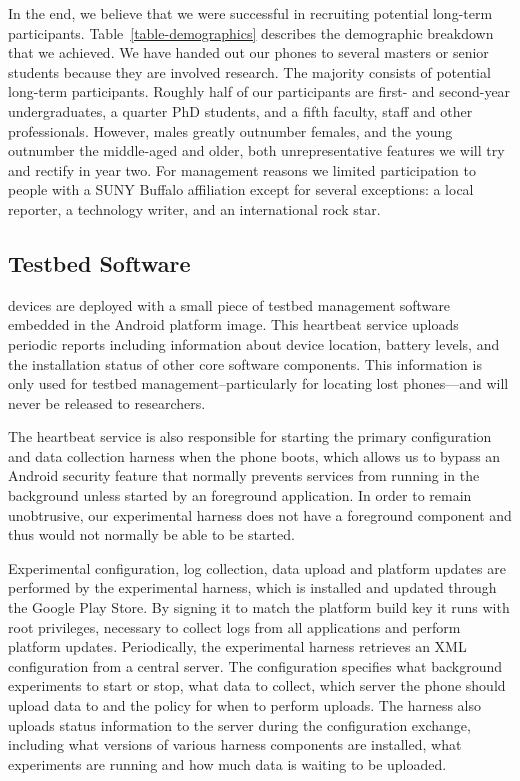 In the end, we believe that we were successful in recruiting potential
long-term participants. Table~\ref{table-demographics} describes the
demographic breakdown that we achieved. We have handed out our phones to
several masters or senior students because they are involved \PhoneLab{}
research. The majority consists of potential long-term participants. Roughly
half of our participants are first- and second-year undergraduates, a quarter
PhD students, and a fifth faculty, staff and other professionals. However,
males greatly outnumber females, and the young outnumber the middle-aged and
older, both unrepresentative features we will try and rectify in year two.
For management reasons we limited participation to people with a SUNY Buffalo
affiliation except for several exceptions: a local reporter, a technology
writer, and an international rock star.

\subsection{Testbed Software}

\PhoneLab{} devices are deployed with a small piece of testbed management
software embedded in the Android platform image. This heartbeat service
uploads periodic reports including information about device location, battery
levels, and the installation status of other core \PhoneLab{} software
components. This information is only used for testbed
management--particularly for locating lost phones---and will never be
released to researchers.

The heartbeat service is also responsible for starting the primary
\PhoneLab{} configuration and data collection harness when the phone boots,
which allows us to bypass an Android security feature that normally prevents
services from running in the background unless started by an foreground
application. In order to remain unobtrusive, our experimental harness does
not have a foreground component and thus would not normally be able to be
started.

\clearpage

Experimental configuration, log collection, data upload and platform updates
are performed by the \PhoneLab{} experimental harness, which is installed and
updated through the Google Play Store. By signing it to match the platform
build key it runs with root privileges, necessary to collect logs from all
applications and perform platform updates. Periodically, the experimental
harness retrieves an XML configuration from a central \PhoneLab{} server. The
configuration specifies what background experiments to start or stop, what
data to collect, which server the phone should upload data to and the policy
for when to perform uploads. The \PhoneLab{} harness also uploads status
information to the server during the configuration exchange, including what
versions of various harness components are installed, what experiments are
running and how much data is waiting to be uploaded.

